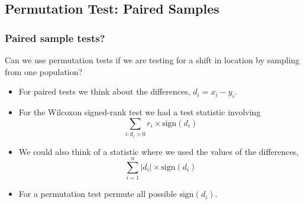 \documentclass[a4paper]{article}\usepackage[]{graphicx}\usepackage[]{xcolor}
\begin{document}
\subsection{Permutation Test: Paired Samples}
\subsubsection{Paired sample tests?}
Can we use permutation tests if we are testing for a shift in location by sampling from one population?
\begin{itemize}
	\item For paired tests we think about the differences, \( d_i = x_i - y_i \).
	\item For the Wilcoxon signed-rank test we had a test statistic involving
	\[
		\sum_{i: d_i > 0} r_i \times \mathrm{sign}(d_i)
	\]
	\item We could also think of a statistic where we used the values of the differences,
	\[
		\sum_{i=1}^{n} \lvert d_i \rvert \times \mathrm{sign}(d_i)
	\]
	\item For a permutation test permute all possible \( \mathrm{sign}(d_i) \).
\end{itemize}
\end{document}
